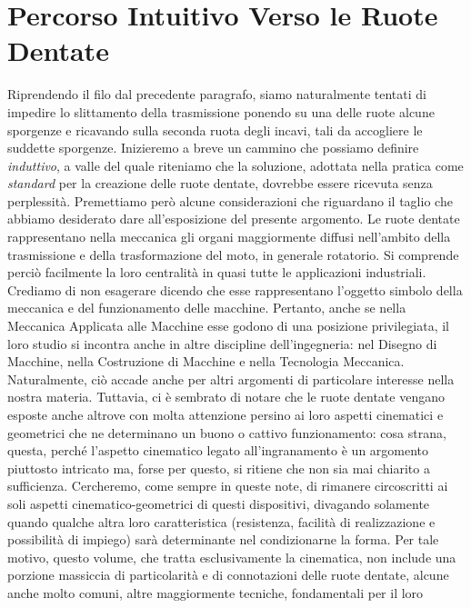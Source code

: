 \section{Percorso Intuitivo Verso le Ruote Dentate} \label{percorso-ruote}

\noindent Riprendendo il filo dal precedente paragrafo,
siamo naturalmente tentati di impedire lo slittamento della trasmissione
ponendo su una delle ruote
alcune sporgenze e ricavando sulla seconda ruota degli incavi, tali da accogliere
le suddette sporgenze.
Inizieremo a breve un cammino che possiamo definire {\em induttivo}, a valle
del quale riteniamo che la soluzione,
adottata nella pratica come {\em standard} per la creazione delle
ruote dentate, dovrebbe essere ricevuta senza perplessit\`a. 
Premettiamo per\`o alcune considerazioni che riguardano il taglio che abbiamo
desiderato dare all'esposizione del presente argomento.
Le ruote dentate rappresentano nella meccanica gli organi maggiormente
diffusi nell'ambito della trasmissione e della trasformazione del moto, in
generale rotatorio. Si comprende perci\`o facilmente la loro
centralit\`a
in quasi tutte le applicazioni industriali. Crediamo di non esagerare dicendo
che esse rappresentano l'oggetto simbolo della meccanica e del funzionamento
delle macchine.
Pertanto, anche se nella Meccanica Applicata alle Macchine esse godono di una
posizione privilegiata, il loro studio si incontra anche in altre discipline
dell'ingegneria: nel Disegno di Macchine, nella Costruzione di Macchine e nella
Tecnologia Meccanica. Naturalmente, ci\`o accade anche per altri argomenti
di particolare interesse nella nostra 
materia. Tuttavia, ci \`e sembrato di notare 
che le ruote dentate vengano esposte anche altrove
con molta attenzione persino ai loro aspetti cinematici
e geometrici che ne determinano un
buono o cattivo funzionamento: cosa strana, questa, perch\'e l'aspetto
cinematico legato all'ingranamento \`e un argomento piuttosto intricato ma,
forse per questo, si ritiene che non sia mai chiarito a sufficienza.
Cercheremo, come sempre in queste note,
di rimanere circoscritti ai soli aspetti cinematico-geometrici
di questi dispositivi, divagando solamente quando qualche altra loro
caratteristica
(resistenza, facilit\`a di realizzazione e possibilit\`a di impiego) 
sar\`a determinante nel condizionarne la forma. Per tale motivo, questo volume,
che tratta esclusivamente la cinematica, non include
una porzione massiccia di particolarit\`a e di connotazioni delle
ruote dentate, alcune anche molto comuni, altre maggiormente 
tecniche, fondamentali per il loro
